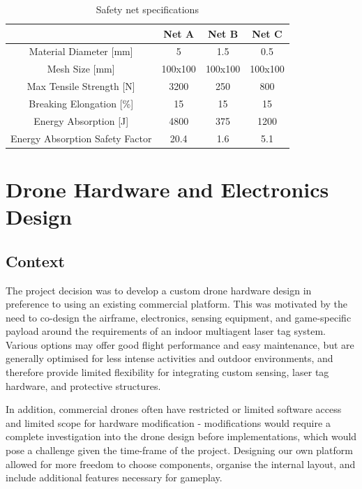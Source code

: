 \documentclass{report_template_oxford}
\begin{document}
\begin{table}[htbp] 
    \centering
    \caption{Safety net specifications}
    \label{SafetyNetSpecs}
    \begin{tabular}{|c| c c c|}
        \hline
        \textbf{} & \textbf{Net A} & \textbf{Net B} & \textbf{Net C}\\
        \hline 
        Material Diameter [mm] & 5 & 1.5 & 0.5\\
        \hline
        Mesh Size [mm] & 100x100 & 100x100 & 100x100 \\
        \hline
        Max Tensile Strength [N] & 3200 & 250& 800 \\
        \hline
        Breaking Elongation [\%]        & 15                & 15                & 15                \\
        \hline
        Energy Absorption [J]           & 4800              & 375               & 1200              \\
        \hline
        Energy Absorption Safety Factor & 20.4              & 1.6               & 5.1               \\
        \hline
    \end{tabular}
\end{table}

\newpage


\section{Drone Hardware and Electronics Design} %
\label{hardware}

\subsection{Context}

The project decision was to develop a custom drone hardware design in preference to using an existing commercial platform. This was motivated by the need to co-design the airframe, electronics, sensing equipment, and game-specific payload around the requirements of an indoor multiagent laser tag system. Various options may offer good flight performance and easy maintenance, but are generally optimised for less intense activities and outdoor environments, and therefore provide limited flexibility for integrating custom sensing, laser tag hardware, and protective structures. 

In addition, commercial drones often have restricted or limited software access and limited scope for hardware modification - modifications would require a complete investigation into the drone design before implementations, which would pose a challenge given the time-frame of the project. Designing our own platform allowed for more freedom to choose components, organise the internal layout, and include additional features necessary for gameplay.
\end{document}
